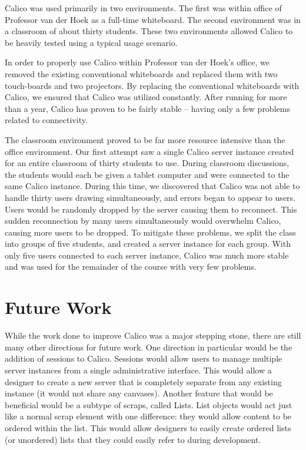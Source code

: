 Calico was used primarily in two environments. The first was within office of Professor van der Hoek as a full-time whiteboard. The second environment was in a classroom of about thirty students. These two environments allowed Calico to be heavily tested using a typical usage scenario. 

In order to properly use Calico within Professor van der Hoek's office, we removed the existing conventional whiteboards and replaced them with two touch-boards and two projectors. By replacing the conventional whiteboards with Calico, we ensured that Calico was utilized constantly. After running for more than a year, Calico has proven to be fairly stable -- having only a few problems related to connectivity.

The classroom environment proved to be far more resource intensive than the office environment. Our first attempt saw a single Calico server instance created for an entire classroom of thirty students to use. During classroom discussions, the students would each be given a tablet computer and were connected to the same Calico instance. During this time, we discovered that Calico was not able to handle thirty users drawing simultaneously, and errors began to appear to users. Users would be randomly dropped by the server causing them to reconnect. This sudden reconnection by many users simultaneously would overwhelm Calico, causing more users to be dropped.  To mitigate these problems, we split the class into groups of five students, and created a server instance for each group. With only five users connected to each server instance, Calico was much more stable and was used for the remainder of the course with very few problems.

%

\section*{Future Work}
While the work done to improve Calico was a major stepping stone, there are still many other directions for future work. One direction in particular would be the addition of sessions to Calico. Sessions would allow users to manage multiple server instances from a single administrative interface. This would allow a designer to create a new server that is completely separate from any existing instance (it would not share any canvases). Another feature that would be beneficial would be a subtype of scraps, called Lists. List objects would act just like a normal scrap element with one difference: they would allow content to be ordered within the list. This would allow designers to easily create ordered lists (or unordered) lists that they could easily refer to during development. 